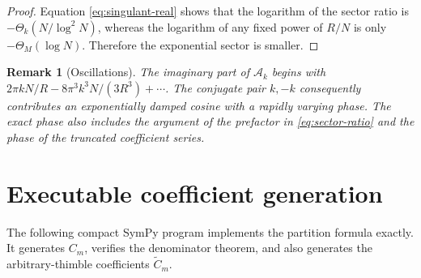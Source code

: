 \documentclass[11pt,a4paper]{article}
\newtheorem{remark}[theorem]{Remark}
\theoremstyle{definition}
\newcommand{\cA}{\mathcal A}
\begin{document}
\begin{proof}
Equation \eqref{eq:singulant-real} shows that the logarithm of the sector ratio
is $-\Theta_k(N/\log^2N)$, whereas the logarithm of any fixed power of $R/N$
is only $-\Theta_M(\log N)$.  Therefore the exponential sector is smaller.
\end{proof}

\begin{remark}[Oscillations]
The imaginary part of $\cA_k$ begins with
$2\pi kN/R-8\pi^3k^3N/(3R^3)+\cdots$.  The conjugate pair
$k,-k$ consequently contributes an exponentially damped cosine with a rapidly
varying phase.  The exact phase also includes the argument of the prefactor in
\eqref{eq:sector-ratio} and the phase of the truncated coefficient series.
\end{remark}

\section{Executable coefficient generation}

The following compact SymPy program implements the partition formula exactly.
It generates $C_m$, verifies the denominator theorem, and also generates the
arbitrary-thimble coefficients $\widetilde C_m$.
\end{document}
